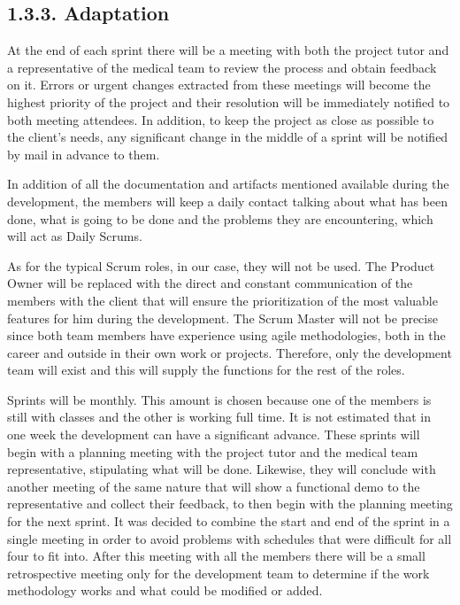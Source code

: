      \subsection*{1.3.3. Adaptation}
    
    At the end of each sprint there will be a meeting with both the project tutor and a representative of the medical team to review the process and obtain feedback on it. Errors or urgent changes extracted from these meetings will become the highest priority of the project and their resolution will be immediately notified to both meeting attendees. In addition, to keep the project as close as possible to the client's needs, any significant change in the middle of a sprint will be notified by mail in advance to them.\newline
    
    In addition of all the documentation and artifacts mentioned available during the development, the members will keep a daily contact talking about what has been done, what is going to be done and the problems they are encountering, which will act as Daily Scrums.\newline
	
	As for the typical Scrum roles, in our case, they will not be used. The Product Owner will be replaced with the direct and constant communication of the members with the client that will ensure the prioritization of the most valuable features for him during the development. The Scrum Master will not be precise since both team members have experience using agile methodologies, both in the career and outside in their own work or projects. Therefore, only the development team will exist and this will supply the functions for the rest of the roles.\newline
	
	Sprints will be monthly. This amount is chosen because one of the members is still with classes and the other is working full time. It is not estimated that in one week the development can have a  significant advance. These sprints will begin with a planning meeting with the project tutor and the medical team representative, stipulating what will be done. Likewise, they will conclude with another meeting of the same nature that will show a functional demo to the representative and collect their feedback, to then begin with the planning meeting for the next sprint. It was decided to combine the start and end of the sprint in a single meeting in order to avoid problems with schedules that were difficult for all four to fit into. After this meeting with all the members there will be a small retrospective meeting only for the development team to determine if the work methodology works and what could be modified or added.